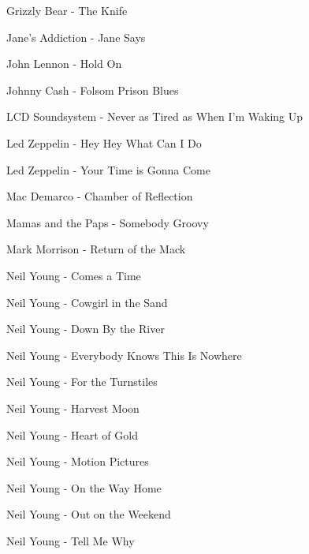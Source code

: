 Grizzly Bear - The Knife \dotfill \pageref{The Knife - Grizzly Bear} 

Jane's Addiction - Jane Says \dotfill \pageref{Jane Says - Jane's Addiction} 

John Lennon - Hold On \dotfill \pageref{Hold On - John Lennon} 

Johnny Cash - Folsom Prison Blues \dotfill \pageref{Folsom Prison Blues - Johnny Cash} 

LCD Soundsystem - Never as Tired as When I'm Waking Up \dotfill \pageref{Never as Tired as When I'm Waking Up - LCD Soundsystem} 

Led Zeppelin - Hey Hey What Can I Do \dotfill \pageref{Hey Hey What Can I Do - Led Zeppelin} 

Led Zeppelin - Your Time is Gonna Come \dotfill \pageref{Your Time is Gonna Come - Led Zeppelin} 

Mac Demarco - Chamber of Reflection \dotfill \pageref{Chamber of Reflection - Mac Demarco} 

Mamas and the Paps - Somebody Groovy \dotfill \pageref{Somebody Groovy - Mamas and the Paps} 

Mark Morrison - Return of the Mack \dotfill \pageref{Return of the Mack - Mark Morrison} 

Neil Young - Comes a Time \dotfill \pageref{Comes a Time - Neil Young} 

Neil Young - Cowgirl in the Sand \dotfill \pageref{Cowgirl in the Sand - Neil Young} 

Neil Young - Down By the River \dotfill \pageref{Down By the River - Neil Young} 

Neil Young - Everybody Knows This Is Nowhere \dotfill \pageref{Everybody Knows This Is Nowhere - Neil Young} 

Neil Young - For the Turnstiles \dotfill \pageref{For the Turnstiles - Neil Young} 

Neil Young - Harvest Moon \dotfill \pageref{Harvest Moon - Neil Young} 

Neil Young - Heart of Gold \dotfill \pageref{Heart of Gold - Neil Young} 

Neil Young - Motion Pictures \dotfill \pageref{Motion Pictures - Neil Young} 

Neil Young - On the Way Home \dotfill \pageref{On the Way Home - Neil Young} 

Neil Young - Out on the Weekend \dotfill \pageref{Out on the Weekend - Neil Young} 

Neil Young - Tell Me Why \dotfill \pageref{Tell Me Why - Neil Young} 

